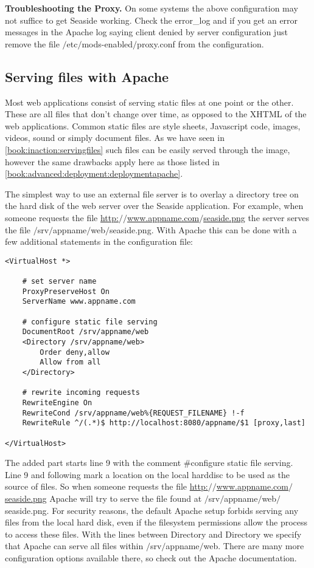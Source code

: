\documentclass[a4paper,10pt,twoside]{book}
\newcommand{\ct}[1]{{\small\ttfamily\textup{#1}}}
\begin{document}
\textbf{Troubleshooting the Proxy.} On some systems the above configuration may not suffice to get Seaside working. Check the error\_log and if you get an error messages in the Apache log saying \ct{client denied by server configuration} just remove the file \ct{$/$etc$/$mods-enabled$/$proxy.conf} from the configuration.

\subsection{Serving files with Apache}
\label{book:advanced:deployment:deploymentapache:servingfiles}

Most web applications consist of serving static files at one point or the other. These are all files that don't change over time, as opposed to the XHTML of the web applications. Common static files are style sheets, Javascript code, images, videos, sound or simply document files. As we have seen in \autoref{book:inaction:servingfiles} such files can be easily served through the image, however the same drawbacks apply here as those listed in \autoref{book:advanced:deployment:deploymentapache}.

The simplest way to use an external file server is to overlay a directory tree on the hard disk of the web server over the Seaside application. For example, when someone requests the file \href{http://www.appname.com/seaside.png}{http:$/$$/$www.appname.com$/$seaside.png} the server serves the file \ct{$/$srv$/$appname$/$web$/$seaside.png}. With Apache this can be done with a few additional statements in the configuration file:

\begin{lstlisting}
<VirtualHost *>

    # set server name
    ProxyPreserveHost On
    ServerName www.appname.com
    
    # configure static file serving
    DocumentRoot /srv/appname/web
    <Directory /srv/appname/web>
        Order deny,allow
        Allow from all
    </Directory>
    
    # rewrite incoming requests
    RewriteEngine On
    RewriteCond /srv/appname/web%{REQUEST_FILENAME} !-f
    RewriteRule ^/(.*)$ http://localhost:8080/appname/$1 [proxy,last]

</VirtualHost>
\end{lstlisting}

The added part starts line 9 with the  comment \ct{\#configure static file serving}. Line 9 and following mark a location on the local harddisc to be used as the source of files. So when someone requests the file \href{http://www.appname.com/seaside.png}{http:$/$$/$www.appname.com$/$seaside.png} Apache will try to serve the file found at \ct{$/$srv$/$appname$/$web$/$seaside.png}. For security reasons, the default Apache setup forbids serving any files from the local hard disk, even if the filesystem permissions allow the process to access these files. With the lines between \ct{Directory} and \ct{Directory} we specify that Apache can serve all files within \ct{$/$srv$/$appname$/$web}. There are many more configuration options available there, so check out the Apache documentation.
\end{document}
